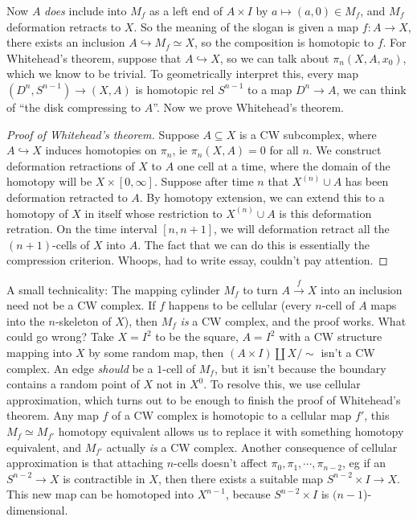 Now $A$ \emph{does} include into $M_f$ as a left end of $A\times I$ by $a \mapsto (a,0)\in M_f$, and $M_f$ deformation retracts to $X$. So the meaning of the slogan is given a map $f \colon A \to  X $, there exists an inclusion $A\hookrightarrow M_f \simeq X$, so the composition is homotopic to $f$. For Whitehead's theorem, suppose that $A\hookrightarrow X$, so we can talk about $\pi_n (X,A,x_0)$, which we know to be trivial. To geometrically interpret this, every map $(D^n  , S^{n-1})\to (X,A)$ is homotopic rel $S^{n-1}$ to a map $D^n \to A$, we can think of ``the disk compressing to $A$''. Now we prove Whitehead's theorem.

\begin{proof}[Proof of Whitehead's theorem]
    Suppose $A\subseteq X$ is a CW subcomplex, where $A \hookrightarrow X$ induces homotopies on $\pi_n $, ie $\pi_n (X,A)=0$ for all $n$. We construct deformation retractions of $X$ to $A$ one cell at a time, where the domain of the homotopy will be $X\times [0,\infty]$. Suppose after time $n$ that $X^{(n)}\cup A$ has been deformation retracted to $A$. By homotopy extension, we can extend this to a homotopy of $X$ in itself whose restriction to $X^{(n)}\cup A$ is this deformation retration. On the time interval $[n,n+1]$, we will deformation retract all the $(n+1)$-cells of $X$ into $A$. The fact that we can do this is essentially the compression criterion. Whoops, had to write essay, couldn't pay attention.
\end{proof}
A small technicality: The mapping cylinder $M_f$ to turn $A\overset{f}{\to } X$ into an inclusion need not be a CW complex. If $f$ happens to be cellular (every $n$-cell of $A$ maps into the $n$-skeleton of $X$), then $M_f$ \emph{is} a CW complex, and the proof works. What could go wrong? Take $X=I^2$ to be the square, $A=I^2$ with a CW structure mapping into $X$ by some random map, then $(A\times I) \amalg X /\sim$ isn't a CW complex. An edge \emph{should} be a $1$-cell of $M_f$, but it isn't because the boundary contains a random point of $X$ not in $X^0$. To resolve this, we use cellular approximation, which turns out to be enough to finish the proof of Whitehead's theorem. Any map $f$ of a CW complex is homotopic to a cellular map $f'$, this $M_f \simeq M_{f'}$ homotopy equivalent allows us to replace it with something homotopy equivalent, and $M_{f'}$ actually \emph{is} a CW complex. Another consequence of cellular approximation is that attaching $n$-cells doesn't affect $\pi_0, \pi_1,\cdots , \pi_{n-2}$, eg if an $S^{n-2}\to X$ is contractible in $X$, then there exists a suitable map $S^{n-2}\times I\to X$. This new map can be homotoped into $X^{n-1}$, because $S^{n-2}\times I$ is $(n-1$)-dimensional.
